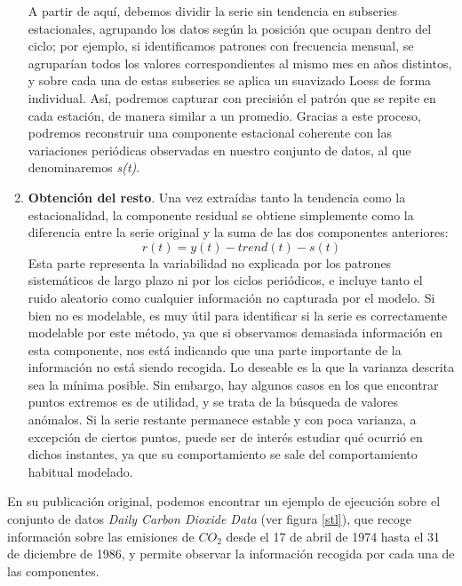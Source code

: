 \begin{enumerate}
    A partir de aquí, debemos dividir la serie sin tendencia en subseries estacionales, agrupando los datos según la posición que ocupan dentro del ciclo; por ejemplo, si identificamos patrones con frecuencia mensual, se agruparían todos los valores correspondientes al mismo mes en años distintos, y sobre cada una de estas subseries se aplica un suavizado Loess de forma individual. Así, podremos capturar con precisión el patrón que se repite en cada estación, de manera similar a un promedio. Gracias a este proceso, podremos reconstruir una componente estacional coherente con las variaciones periódicas observadas en nuestro conjunto de datos, al que denominaremos \textit{s(t)}.

    \item \textbf{Obtención del resto}. Una vez extraídas tanto la tendencia como la estacionalidad, la componente residual se obtiene simplemente como la diferencia entre la serie original y la suma de las dos componentes anteriores:
    $$r(t) = y(t) - trend(t) - s(t)$$
    Esta parte representa la variabilidad no explicada por los patrones sistemáticos de largo plazo ni por los ciclos periódicos, e incluye tanto el ruido aleatorio como cualquier información no capturada por el modelo. Si bien no es modelable, es muy útil para identificar si la serie es correctamente modelable por este método, ya que si observamos demasiada información en esta componente, nos está indicando que una parte importante de la información no está siendo recogida. Lo deseable es la que la varianza descrita sea la mínima posible. Sin embargo, hay algunos casos en los que encontrar puntos extremos es de utilidad, y se trata de la búsqueda de valores anómalos. Si la serie restante permanece estable y con poca varianza, a excepción de ciertos puntos, puede ser de interés estudiar qué ocurrió en dichos instantes, ya que su comportamiento se sale del comportamiento habitual modelado.
\end{enumerate}

En su publicación original, podemos encontrar un ejemplo de ejecución sobre el conjunto de datos \textit{Daily Carbon Dioxide Data} (ver figura \ref{stl}), que recoge información sobre las emisiones de $CO_2$ desde el 17 de abril de 1974 hasta el 31 de diciembre de 1986, y permite observar la información recogida por cada una de las componentes.

